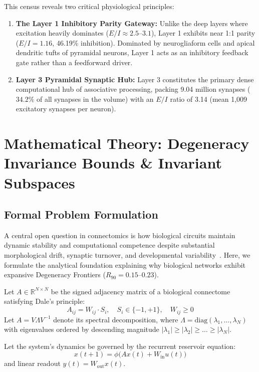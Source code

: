 \documentclass[11pt,letterpaper]{report}
\begin{document}
This census reveals two critical physiological principles:
\begin{enumerate}[leftmargin=*]
    \item \textbf{The Layer 1 Inhibitory Parity Gateway:} Unlike the deep layers where excitation heavily dominates ($E/I \approx 2.5\text{--}3.1$), Layer 1 exhibits near 1:1 parity ($E/I = 1.16$, 46.19\% inhibition). Dominated by neurogliaform cells and apical dendritic tufts of pyramidal neurons, Layer 1 acts as an inhibitory feedback gate rather than a feedforward driver.
    \item \textbf{Layer 3 Pyramidal Synaptic Hub:} Layer 3 constitutes the primary dense computational hub of associative processing, packing 9.04 million synapses ($34.2\%$ of all synapses in the volume) with an $E/I$ ratio of 3.14 (mean 1,009 excitatory synapses per neuron).
\end{enumerate}

\newpage

\chapter{Mathematical Theory: Degeneracy Invariance Bounds \& Invariant Subspaces}

\section{Formal Problem Formulation}
A central open question in connectomics is how biological circuits maintain dynamic stability and computational competence despite substantial morphological drift, synaptic turnover, and developmental variability~\cite{marder2011variability, edelman2001degeneracy}. Here, we formulate the analytical foundation explaining why biological networks exhibit expansive Degeneracy Frontiers ($R_{90} = 0.15\text{--}0.23$).

Let $A \in \mathbb{R}^{N \times N}$ be the signed adjacency matrix of a biological connectome satisfying Dale's principle:
\begin{equation}
A_{ij} = W_{ij} \cdot S_i, \quad S_i \in \{-1, +1\}, \quad W_{ij} \ge 0
\end{equation}
Let $A = V \Lambda V^{-1}$ denote its spectral decomposition, where $\Lambda = \mathrm{diag}(\lambda_1, \dots, \lambda_N)$ with eigenvalues ordered by descending magnitude $|\lambda_1| \ge |\lambda_2| \ge \dots \ge |\lambda_N|$. 

Let the system's dynamics be governed by the recurrent reservoir equation:
\begin{equation}
x(t+1) = \phi\big( A x(t) + W_{\mathrm{in}} u(t) \big)
\end{equation}
and linear readout $y(t) = W_{\mathrm{out}} x(t)$. 
\end{document}
